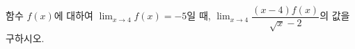 함수 $f(x)$에 대하여 $\displaystyle\lim_{x\to 4}f(x)=-5$일 때, $\displaystyle\lim_{x\to 4}\dfrac{(x-4)f(x)}{\sqrt{x}-2}$의 값을 구하시오.
